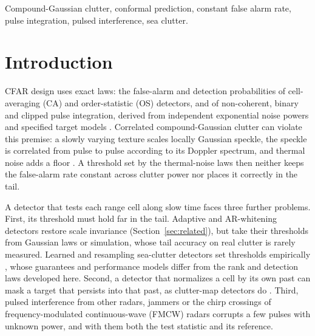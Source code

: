 \documentclass[journal]{IEEEtran}
\begin{document}
\begin{IEEEkeywords}
Compound-Gaussian clutter, conformal prediction, constant false alarm rate, pulse integration, pulsed interference, sea clutter.
\end{IEEEkeywords}

\section{Introduction}
 CFAR design uses exact laws: the false-alarm and detection probabilities of cell-averaging (CA) and order-statistic (OS) detectors, and of non-coherent, binary and clipped pulse integration, derived from independent exponential noise powers and specified target models \cite{finn1968,rohling1983,gandhi1988,richards2014,abbasi2018clip}. Correlated compound-Gaussian clutter can violate this premise: a slowly varying texture scales locally Gaussian speckle, the speckle is correlated from pulse to pulse according to its Doppler spectrum, and thermal noise adds a floor \cite{ward2013,conte1995,ollila2012}. A threshold set by the thermal-noise laws then neither keeps the false-alarm rate constant across clutter power nor places it correctly in the tail.

A detector that tests each range cell along slow time faces three further problems. First, its threshold must hold far in the tail. Adaptive and AR-whitening detectors restore scale invariance (Section~\ref{sec:related}), but take their thresholds from Gaussian laws or simulation, whose tail accuracy on real clutter is rarely measured. Learned and resampling sea-clutter detectors set thresholds empirically \cite{bai2026cvae,rouzoumka2026ood,qu2023sensors,qu2024sieve,qu2026sact}, whose guarantees and performance models differ from the rank and detection laws developed here. Second, a detector that normalizes a cell by its own past can mask a target that persists into that past, as clutter-map detectors do \cite{lops1989,naldi1999}. Third, pulsed interference from other radars, jammers or the chirp crossings of frequency-modulated continuous-wave (FMCW) radars corrupts a few pulses with unknown power, and with them both the test statistic and its reference.
\end{document}
